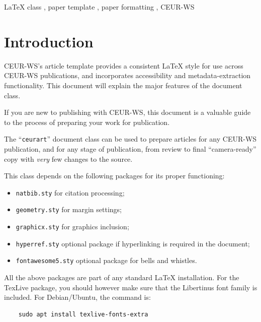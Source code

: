 \documentclass[
]{ceurart}
\begin{document}
\begin{keywords}
  LaTeX class \sep
  paper template \sep
  paper formatting \sep
  CEUR-WS
\end{keywords}

\maketitle

\section{Introduction}

CEUR-WS's article template provides a consistent \LaTeX{} style for
use across CEUR-WS publications, and incorporates accessibility and
metadata-extraction functionality. This document will explain the
major features of the document class.

If you are new to publishing with CEUR-WS, this document is a valuable
guide to the process of preparing your work for publication.

The ``\verb|ceurart|'' document class can be used to prepare articles
for any CEUR-WS publication, and for any stage of publication, from
review to final ``camera-ready'' copy with {\itshape very} few changes
to the source.

This class depends on the following packages
for its proper functioning:

\begin{itemize}
  \item \verb|natbib.sty| for citation processing;
  \item \verb|geometry.sty| for margin settings;
  \item \verb|graphicx.sty| for graphics inclusion;
  \item \verb|hyperref.sty| optional package if hyperlinking is required in
        the document;
  \item \verb|fontawesome5.sty| optional package for bells and whistles.
\end{itemize}

All the above packages are part of any
standard \LaTeX{} installation.
For the TexLive package, you should however make sure that the
Libertinus font family is included. For Debian/Ubuntu, the command is:
\begin{verbatim}
    sudo apt install texlive-fonts-extra
\end{verbatim}
\end{document}
